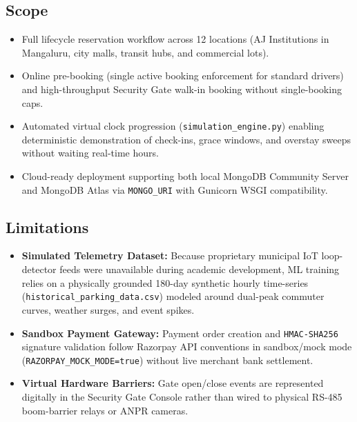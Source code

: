 \documentclass[12pt,a4paper,oneside]{report}
\begin{document}
\subsection{Scope}
\begin{itemize}[leftmargin=*]
  \item Full lifecycle reservation workflow across 12 locations (AJ Institutions in Mangaluru, city malls, transit hubs, and commercial lots).
  \item Online pre-booking (single active booking enforcement for standard drivers) and high-throughput Security Gate walk-in booking without single-booking caps.
  \item Automated virtual clock progression (\texttt{simulation\_engine.py}) enabling deterministic demonstration of check-ins, grace windows, and overstay sweeps without waiting real-time hours.
  \item Cloud-ready deployment supporting both local MongoDB Community Server and MongoDB Atlas via \texttt{MONGO\_URI} with Gunicorn WSGI compatibility.
\end{itemize}

\subsection{Limitations}
\begin{itemize}[leftmargin=*]
  \item \textbf{Simulated Telemetry Dataset:} Because proprietary municipal IoT loop-detector feeds were unavailable during academic development, ML training relies on a physically grounded 180-day synthetic hourly time-series (\texttt{historical\_parking\_data.csv}) modeled around dual-peak commuter curves, weather surges, and event spikes.
  \item \textbf{Sandbox Payment Gateway:} Payment order creation and \texttt{HMAC-SHA256} signature validation follow Razorpay API conventions in sandbox/mock mode (\texttt{RAZORPAY\_MOCK\_MODE=true}) without live merchant bank settlement.
  \item \textbf{Virtual Hardware Barriers:} Gate open/close events are represented digitally in the Security Gate Console rather than wired to physical RS-485 boom-barrier relays or ANPR cameras.
\end{itemize}

\end{document}
